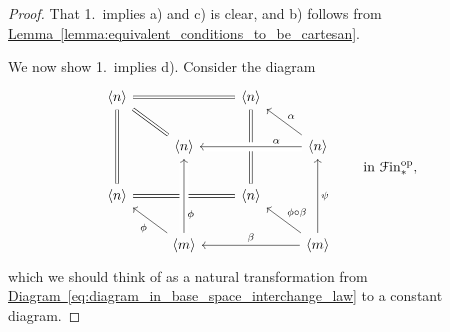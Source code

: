 \documentclass[main.tex]{subfiles}
\begin{document}
\begin{proof}
  That 1.\ implies a) and c) is clear, and b) follows from \hyperref[lemma:equivalent_conditions_to_be_cartesan]{Lemma~\ref*{lemma:equivalent_conditions_to_be_cartesan}}.

  We now show 1.\ implies d). Consider the diagram
  \begin{equation*}
    \begin{tikzcd}
      \langle n \rangle
      \arrow[rr, equals]
      \arrow[dd, equals]
      \arrow[dr, equals]
      && \langle n \rangle
      \arrow[dd, equals]
      \arrow[dr, leftarrow, "\alpha"]
      \\
      & \langle n \rangle
      \arrow[rr, leftarrow, crossing over, near end, "\alpha"]
      && \langle n \rangle
      \arrow[dd, leftarrow, "\psi"]
      \\
      \langle n \rangle
      \arrow[rr, equals]
      \arrow[dr, leftarrow, swap, "\phi"]
      && \langle n \rangle
      \arrow[dr, leftarrow, "\phi \circ \beta"]
      \\
      & \langle m \rangle
      \arrow[uu, near start, crossing over, swap, "\phi"]
      \arrow[rr, leftarrow, "\beta"]
      && \langle m \rangle
    \end{tikzcd}
    \qquad \text{in }\Finp\op,
  \end{equation*}
  which we should think of as a natural transformation from \hyperref[eq:diagram_in_base_space_interchange_law]{Diagram~\ref*{eq:diagram_in_base_space_interchange_law}} to a constant diagram.


\end{proof}
\end{document}
